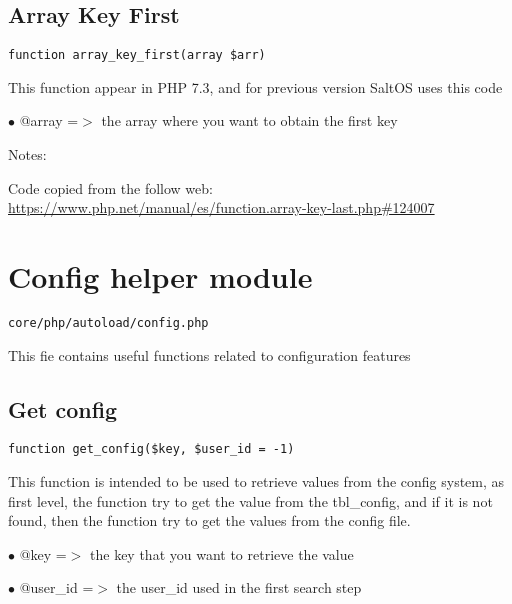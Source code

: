 \documentclass[a4paper]{book}
\def\htmladdnormallink#1#2{\href{#2}{#1}}
\begin{document}
\hypertarget{toc49}{}
\subsection{Array Key First}

\begin{lstlisting}
function array_key_first(array $arr)
\end{lstlisting}

This function appear in PHP 7.3, and for previous version SaltOS
uses this code

\begin{compactitem}
\item[\color{myblue}$\bullet$] @array =$>$ the array where you want to obtain the first key
\end{compactitem}

Notes:

Code copied from the follow web:
\htmladdnormallink{https://www.php.net/manual/es/function.array-key-last.php\#124007}{https://www.php.net/manual/es/function.array-key-last.php\#124007}

\hypertarget{toc50}{}
\section{Config helper module}

\begin{lstlisting}
core/php/autoload/config.php
\end{lstlisting}

This fie contains useful functions related to configuration features

\hypertarget{toc51}{}
\subsection{Get config}

\begin{lstlisting}
function get_config($key, $user_id = -1)
\end{lstlisting}

This function is intended to be used to retrieve values from the
config system, as first level, the function try to get the value from
the tbl\_config, and if it is not found, then the function try to get
the values from the config file.

\begin{compactitem}
\item[\color{myblue}$\bullet$] @key     =$>$ the key that you want to retrieve the value
\item[\color{myblue}$\bullet$] @user\_id =$>$ the user\_id used in the first search step
\end{compactitem}
\end{document}
